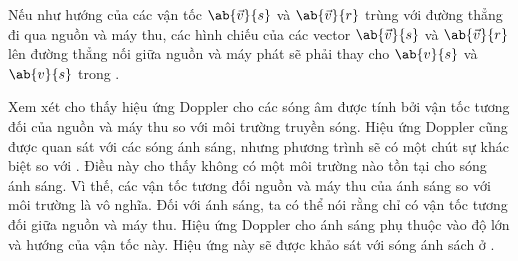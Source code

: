 Nếu như hướng của các vận tốc $\ab{\vec{v}}{s}$ và $\ab{\vec{v}}{r}$ trùng với đường thẳng đi qua nguồn và máy thu, các hình chiếu của các vector $\ab{\vec{v}}{s}$ và $\ab{\vec{v}}{r}$ lên đường thẳng nối giữa nguồn và máy phát sẽ phải thay cho $\ab{v}{s}$ và $\ab{v}{s}$ trong .

Xem xét  cho thấy hiệu ứng Doppler cho các sóng âm được tính bởi vận tốc tương đối của nguồn và máy thu so với môi trường truyền sóng.
Hiệu ứng Doppler cũng được quan sát với các sóng ánh sáng, nhưng phương trình sẽ có một chút sự khác biệt so với .
Điều này cho thấy không có một môi trường nào tồn tại cho sóng ánh sáng.
Vì thế, các vận tốc tương đối nguồn và máy thu của ánh sáng so với môi trường là vô nghĩa.
Đối với ánh sáng, ta có thể nói rằng chỉ có vận tốc tương đối giữa nguồn và máy thu.
Hiệu ứng Doppler cho ánh sáng phụ thuộc vào độ lớn và hướng của vận tốc này.
Hiệu ứng này sẽ được khảo sát với sóng ánh sách ở .

